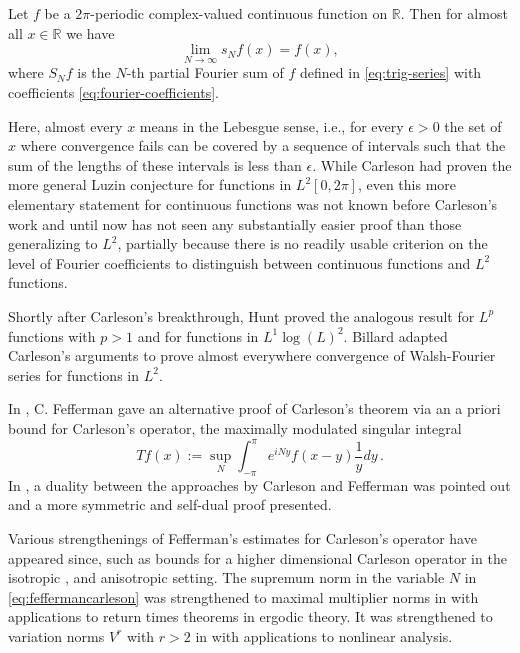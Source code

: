 \begin{theorem}
    \label{classical-carleson}
    \leanok
    Let $f$ be a $2\pi$-periodic complex-valued continuous function on $\mathbb{R}$.
    Then for almost all $x \in \mathbb{R}$ we have
    \begin{equation}\label{eq:fourier-limit}
      \lim_{N\to\infty}s_N f(x) = f(x),
    \end{equation}
    where $S_N f$ is the $N$-th partial Fourier sum of $f$ defined in \eqref{eq:trig-series}
    with coefficients \eqref{eq:fourier-coefficients}.
\end{theorem}

Here, almost every $x$ means in the Lebesgue sense, i.e., for every $\epsilon>0$ the set of $x$ where convergence fails can be covered by a sequence of intervals
such that the sum of the lengths of these
intervals is less than $\epsilon$. While Carleson had proven the more general Luzin conjecture for functions in $L^2[0,2\pi]$, even this more elementary statement for continuous functions was not known before Carleson's work
and until now has not seen any substantially easier proof than
those generalizing to $L^2$, partially because there is no readily usable criterion on the level of
Fourier coefficients to distinguish between continuous functions and $L^2$
functions.


Shortly after Carleson's breakthrough, Hunt \cite{MR238019} proved the analogous result for $L^p$ functions
with $p>1$ and for functions in $L^1\log(L)^2$.
Billard \cite{MR217510} adapted Carleson's arguments to prove almost everywhere convergence of Walsh-Fourier series
for functions in $L^2$.


In \cite{fefferman}, C. Fefferman gave an alternative proof of Carleson's theorem via an a priori
bound for Carleson's operator, the maximally modulated singular integral
\begin{equation}\label{eq:feffermancarleson}
    Tf(x):=\sup_{N} \int_{-\pi}^\pi e^{iNy}f(x-y)\frac 1y {dy}\, .
\end{equation}
In \cite{lacey-thiele}, a duality
between the approaches by Carleson and Fefferman was pointed out and a more symmetric and self-dual proof
presented.


Various strengthenings of Fefferman's estimates for Carleson's operator have appeared since, such as bounds for a higher dimensional Carleson operator in the isotropic
\cite{MR336222}, \cite{MR2007237} and anisotropic \cite{MR4014801} setting.
The supremum norm in the variable $N$ in \eqref{eq:feffermancarleson} was strengthened
to maximal multiplier norms in \cite{MR2420509} with applications to return times theorems in ergodic theory.
It was strengthened to variation norms $V^r$ with $r>2$ in \cite{MR2881301} with applications to nonlinear analysis.

